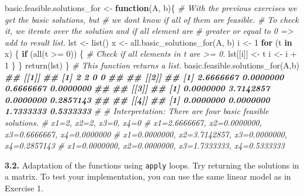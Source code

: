 \documentclass[
]{article}
\newenvironment{Shaded}{\begin{snugshade}}{\end{snugshade}}
\newcommand{\CommentTok}[1]{\textcolor[rgb]{0.56,0.35,0.01}{\textit{#1}}}
\newcommand{\ControlFlowTok}[1]{\textcolor[rgb]{0.13,0.29,0.53}{\textbf{#1}}}
\newcommand{\DecValTok}[1]{\textcolor[rgb]{0.00,0.00,0.81}{#1}}
\newcommand{\DocumentationTok}[1]{\textcolor[rgb]{0.56,0.35,0.01}{\textbf{\textit{#1}}}}
\newcommand{\FunctionTok}[1]{\textcolor[rgb]{0.00,0.00,0.00}{#1}}
\newcommand{\NormalTok}[1]{#1}
\newcommand{\OtherTok}[1]{\textcolor[rgb]{0.56,0.35,0.01}{#1}}
\newcommand{\SpecialCharTok}[1]{\textcolor[rgb]{0.00,0.00,0.00}{#1}}
\begin{document}
\begin{Shaded}
\begin{Highlighting}[]
\NormalTok{basic.feasible.solutions\_for }\OtherTok{\textless{}{-}} \ControlFlowTok{function}\NormalTok{(A, b)\{}
  \CommentTok{\# With the previous exercises we get the basic solutions, but}
  \CommentTok{\# we dont know if all of them are feasible.}
  \CommentTok{\# To check it, we iterate over the solution and if all element are }
  \CommentTok{\# greater or equal to 0 =\textgreater{} add to result list.}
\NormalTok{  lst }\OtherTok{\textless{}{-}} \FunctionTok{list}\NormalTok{()}
\NormalTok{  x }\OtherTok{\textless{}{-}} \FunctionTok{all.basic\_solutions\_for}\NormalTok{(A, b)}
\NormalTok{  i }\OtherTok{\textless{}{-}} \DecValTok{1}
  \ControlFlowTok{for}\NormalTok{ (t }\ControlFlowTok{in}\NormalTok{ x) \{}
    \ControlFlowTok{if}\NormalTok{ (}\FunctionTok{all}\NormalTok{(t }\SpecialCharTok{\textgreater{}=} \DecValTok{0}\NormalTok{)) \{ }\CommentTok{\# Check if all elements in t are \textgreater{}= 0.}
\NormalTok{      lst[[i]] }\OtherTok{\textless{}{-}}\NormalTok{ t}
\NormalTok{      i }\OtherTok{\textless{}{-}}\NormalTok{ i }\SpecialCharTok{+} \DecValTok{1}
\NormalTok{    \}}
\NormalTok{  \}}
  \FunctionTok{return}\NormalTok{(lst)}
\NormalTok{\}}
\CommentTok{\# This function returns a list.}
\FunctionTok{basic.feasible.solutions\_for}\NormalTok{(A,b)}
\DocumentationTok{\#\# [[1]]}
\DocumentationTok{\#\# [1] 2 2 0 0}
\DocumentationTok{\#\# }
\DocumentationTok{\#\# [[2]]}
\DocumentationTok{\#\# [1] 2.6666667 0.0000000 0.6666667 0.0000000}
\DocumentationTok{\#\# }
\DocumentationTok{\#\# [[3]]}
\DocumentationTok{\#\# [1] 0.0000000 3.7142857 0.0000000 0.2857143}
\DocumentationTok{\#\# }
\DocumentationTok{\#\# [[4]]}
\DocumentationTok{\#\# [1] 0.0000000 0.0000000 1.7333333 0.5333333}
\CommentTok{\#}
\CommentTok{\# Interpretation: There are four basic feasible solutions. }
\CommentTok{\# x1=2, x2=2, x3=0, x4=0}
\CommentTok{\# x1=2.6666667, x2=0.0000000, x3=0.6666667, x4=0.0000000}
\CommentTok{\# x1=0.0000000, x2=3.7142857, x3=0.0000000, x4=0.2857143}
\CommentTok{\# x1=0.0000000, x2=0.0000000, x3=1.7333333, x4=0.5333333}
\end{Highlighting}
\end{Shaded}

\textbf{3.2.} Adaptation of the functions using \texttt{apply} loops.
Try returning the solutions in a matrix. To test your implementation,
you can use the same linear model as in Exercise 1.
\end{document}
